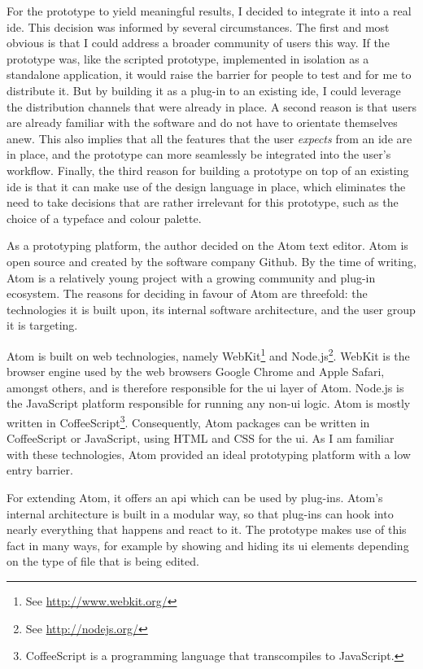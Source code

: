 For the prototype to yield meaningful results, I decided to integrate it
into a real \ac{ide}. This decision was informed by several
circumstances. The first and most obvious is that I could address a
broader community of users this way. If the prototype was, like the
scripted prototype, implemented in isolation as a standalone
application, it would raise the barrier for people to test and for me to
distribute it. But by building it as a plug-in to an existing \ac{ide},
I could leverage the distribution channels that were already in place. A
second reason is that users are already familiar with the software and
do not have to orientate themselves anew. This also implies that all the
features that the user \emph{expects} from an \ac{ide} are in place, and
the prototype can more seamlessly be integrated into the user’s
workflow. Finally, the third reason for building a prototype on top of
an existing \ac{ide} is that it can make use of the design language in
place, which eliminates the need to take decisions that are rather
irrelevant for this prototype, such as the choice of a typeface and
colour palette.

As a prototyping platform, the author decided on the Atom text editor.
Atom is open source and created by the software company Github. By the
time of writing, Atom is a relatively young project with a growing
community and plug-in ecosystem. The reasons for deciding in favour of
Atom are threefold: the technologies it is built upon, its internal
software architecture, and the user group it is targeting.

Atom is built on web technologies, namely
WebKit\footnote{See \url{http://www.webkit.org/}} and
Node.js\footnote{See \url{http://nodejs.org/}}. WebKit is the browser
engine used by the web browsers Google Chrome and Apple Safari, amongst
others, and is therefore responsible for the \acl{ui} layer of Atom.
Node.js is the JavaScript platform responsible for running any
non-\ac{ui} logic. Atom is mostly written in
CoffeeScript\footnote{CoffeeScript is a programming language that transcompiles to JavaScript.}.
Consequently, Atom packages can be written in CoffeeScript or
JavaScript, using HTML and CSS for the \ac{ui}. As I am familiar with
these technologies, Atom provided an ideal prototyping platform with a
low entry barrier.

For extending Atom, it offers an \ac{api} which can be used by plug-ins.
Atom’s internal architecture is built in a modular way, so that plug-ins
can hook into nearly everything that happens and react to it. The
prototype makes use of this fact in many ways, for example by showing
and hiding its \ac{ui} elements depending on the type of file that is
being edited.

